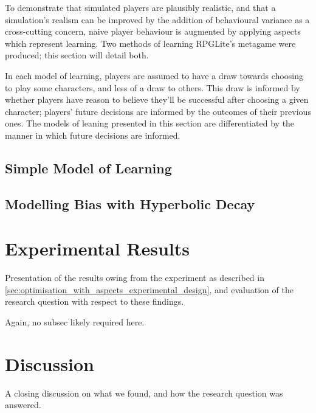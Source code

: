To demonstrate that simulated players are plausibly realistic, and
that a simulation's realism can be improved by the addition of behavioural
variance as a cross-cutting concern, naive player behaviour is augmented by
applying aspects which represent learning. Two methods of learning RPGLite's
metagame were produced; this section will detail both.

In each model of learning, players are assumed to have a draw towards choosing
to play some characters, and less of a draw to others. This draw is informed by
whether players have reason to believe they'll be successful after choosing a
given character; players' future decisions are informed by the outcomes of their
previous ones. The models of leaning presented in this section are
differentiated by the manner in which future decisions are informed.


\subsection{Simple Model of Learning}\label{subsec:optimisation_with_aspects_basiclearningaspect}





\subsection{Modelling Bias with Hyperbolic Decay}\label{subsec:optimisation_with_aspects_hyperbolicdecay}







\section{Experimental Results}\label{sec:optimisation_with_aspects_experimental_results}

Presentation of the results owing from the experiment as described in
\cref{sec:optimisation_with_aspects_experimental_design}, and evaluation of the
research question with respect to these findings.

Again, no subsec likely required here.

\section{Discussion}\label{sec:optimisation_with_aspects_discussion}

A closing discussion on what we found, and how the research question was
answered.